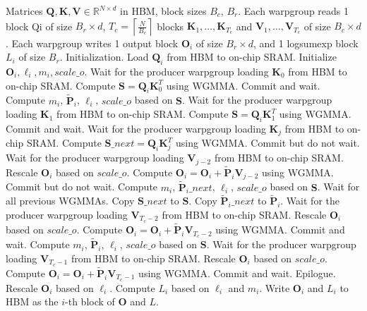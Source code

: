 \documentclass{article}
\newcommand{\vQ}{\mathbf{Q}}
\newcommand{\vK}{\mathbf{K}}
\newcommand{\vV}{\mathbf{V}}
\newcommand{\vS}{\mathbf{S}}
\newcommand{\vP}{\mathbf{P}}
\newcommand{\vO}{\mathbf{O}}
\newcommand{\sysnameone}{\textsc{FlashAttention}\xspace}
\begin{document}
\begin{algorithm}[H]
    \caption{\small\label{alg:flash3_3_stage_wgmma}\sysnameone 3-stage pipelining consumer warpgroup forward pass}
    \begin{algorithmic}[1]
      \REQUIRE Matrices $\vQ, \vK, \vV \in \mathbb{R}^{N \times d}$ in HBM, block sizes $B_c$, $B_r$.
      Each warpgroup reads 1 block Qi of size $B_r \times d$, $T_c = \left\lceil \frac{N}{B_c} \right\rceil$ blocks $\vK_1, \dots, \vK_{T_c}$ and
      $\vV_1, \dots, \vV_{T_c}$ of size $B_c \times d$.
      Each warpgroup writes 1 output block $\vO_i$ of size $B_r \times d$, and 1 logsumexp block $L_i$ of size $B_r$.
      \STATE Initialization. Load $\vQ_i$ from HBM to on-chip SRAM.
      Initialize $\vO_{i}, \ell_{i}, m_{i}, scale\_o$.
      \STATE Wait for the producer warpgroup loading $\vK_0$ from HBM to on-chip SRAM.
      \STATE Compute $\vS = \vQ_i \vK_0^T$ using WGMMA. Commit and wait.
      \STATE Compute $m_{i}$, $\tilde{\vP}_{i}$, $\ell_{i}$, $scale\_o$ based on $\vS$.
      \STATE Wait for the producer warpgroup loading $\vK_1$ from HBM to on-chip SRAM.
      \STATE Compute $\vS = \vQ_i \vK_1^T$ using WGMMA. Commit and wait.
        \STATE Wait for the producer warpgroup loading $\vK_j$ from HBM to on-chip SRAM.
        \STATE Compute $\vS\_next = \vQ_i \vK_{j}^T$ using WGMMA. Commit but do not wait.
        \STATE Wait for the producer warpgroup loading $\vV_{j-2}$ from HBM to on-chip SRAM.
        \STATE Rescale $\vO_{i}$ based on $scale\_o$.
        \STATE Compute
        $\vO_{i} = \vO_{i} + \tilde{\vP}_{i} \vV_{j-2}$ using WGMMA. Commit but do not wait.
        \STATE Compute $m_{i}$, $\tilde{\vP}_{i}\_next$, $\ell_{i}$, $scale\_o$ based on $\vS$.
        \STATE Wait for all previous WGMMAs.
        \STATE Copy $\vS\_next$ to $\vS$.
        \STATE Copy $\tilde{\vP}_{i}\_next$ to $\tilde{\vP}_{i}$.
      \ENDFOR
      \STATE Wait for the producer warpgroup loading $\vV_{T_c-2}$ from HBM to on-chip SRAM.
      \STATE Rescale $\vO_{i}$ based on $scale\_o$.
      \STATE Compute
      $\vO_{i} = \vO_{i} + \tilde{\vP}_{i} \vV_{T_c-2}$ using WGMMA. Commit and wait.
      \STATE Compute $m_{i}$, $\tilde{\vP}_{i}$, $\ell_{i}$, $scale\_o$ based on $\vS$.
      \STATE Wait for the producer warpgroup loading $\vV_{T_c-1}$ from HBM to on-chip SRAM.
      \STATE Rescale $\vO_{i}$ based on $scale\_o$.
      \STATE Compute
      $\vO_{i} = \vO_{i} + \tilde{\vP}_{i} \vV_{T_c-1}$ using WGMMA. Commit and wait.
      \STATE Epilogue. Rescale $\vO_{i}$ based on $\ell_{i}$. Compute $L_{i}$ based on $\ell_{i}$ and $m_{i}$. Write $\vO_{i}$ and $L_{i}$ to HBM as the $i$-th block of $\vO$ and $L$.
    \end{algorithmic}
  \end{algorithm}
\end{document}
